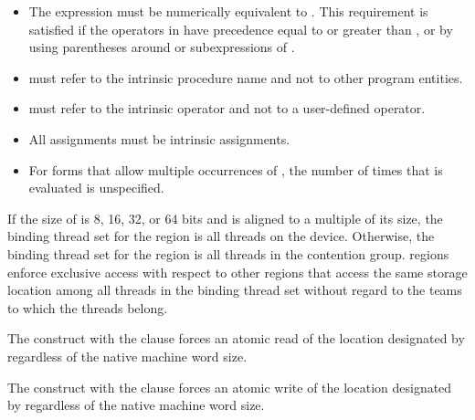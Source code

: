 {{{{\begin{itemize}
\item The expression  must be numerically equivalent to . This requirement is satisfied if the operators in  have precedence equal to or 
greater than , or by using parentheses around  or subexpressions of .

\item {} must refer to the intrinsic procedure name and not to other 
program entities.

\item {} must refer to the intrinsic operator and not to a user-defined operator.

\item All assignments must be intrinsic assignments.

\item For forms that allow multiple occurrences of , the number of times that  is 
evaluated is unspecified.
\fortranspecificend

\end{itemize}

\begin{samepage}

\binding
If the size of  is 8, 16, 32, or 64 bits and  is aligned to a
multiple of its size, the binding thread set for the  region is 
all threads on the device. Otherwise, the binding thread set for the 
 region is all threads in the contention group.   
regions enforce exclusive access with respect to other  regions 
that access the same storage location  among all threads in the 
binding thread set without regard to the teams to which the threads belong. 

\descr
The  construct with the  clause forces an atomic read of the location 
designated by  regardless of the native machine word size.
\end{samepage}

The  construct with the  clause forces an atomic write of the location 
designated by  regardless of the native machine word size.

}}}}
